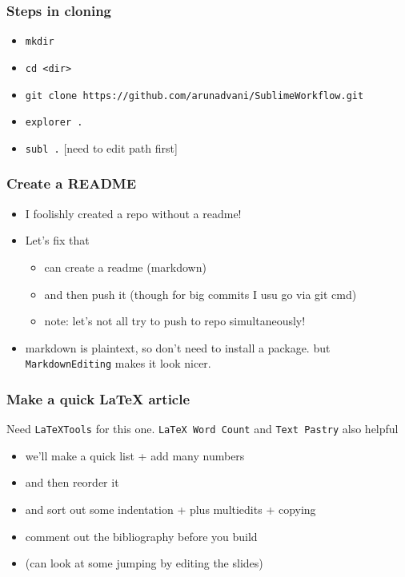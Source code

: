 \documentclass{beamer}
\begin{document}
\begin{frame}
\frametitle{Steps in cloning} \label{Steps in cloning}
	\begin{itemize}
		\item \texttt{mkdir}
		\item \texttt{cd <dir>}
		\item \texttt{git clone https://github.com/arunadvani/SublimeWorkflow.git}
		\item \texttt{explorer .}
		\item \texttt{subl .} [need to edit path first]
	\end{itemize}
\end{frame}

\begin{frame}
\frametitle{Create a README} \label{Create a README}
	\begin{itemize}
		\item I foolishly created a repo without a readme!
		\item Let's fix that 
		\begin{itemize}
			\item can create a readme (markdown)
			\item and then push it (though for big commits I usu go via git cmd)
			\item note: let's not all try to push to repo simultaneously!
		\end{itemize}
		\item markdown is plaintext, so don't need to install a package. but \texttt{MarkdownEditing} makes it look nicer.
	\end{itemize}
\end{frame}

\begin{frame}
\frametitle{Make a quick LaTeX article} \label{Make a quick LaTeX article}
	Need \texttt{LaTeXTools} for this one. \texttt{LaTeX Word Count} and \texttt{Text Pastry} also helpful
	\begin{itemize}
		\item we'll make a quick list + add many numbers
		\item and then reorder it
		\item and sort out some indentation + plus multiedits + copying
		\item comment out the bibliography before you build
		\item (can look at some jumping by editing the slides)
	\end{itemize}
\end{frame}
\end{document}
